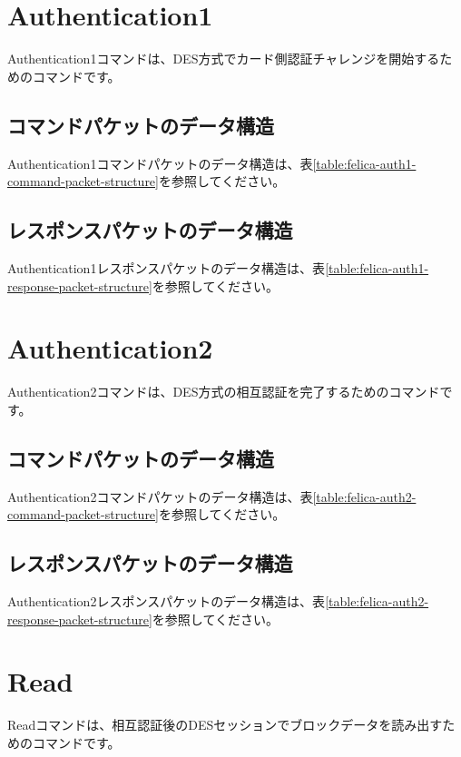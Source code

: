\documentclass[a4paper]{report}
\begin{document}
\section{Authentication1}

Authentication1コマンドは、DES方式でカード側認証チャレンジを開始するためのコマンドです。

\subsection{コマンドパケットのデータ構造}

Authentication1コマンドパケットのデータ構造は、表\ref{table:felica-auth1-command-packet-structure}を参照してください。

\subsection{レスポンスパケットのデータ構造}

Authentication1レスポンスパケットのデータ構造は、表\ref{table:felica-auth1-response-packet-structure}を参照してください。

\section{Authentication2}

Authentication2コマンドは、DES方式の相互認証を完了するためのコマンドです。

\subsection{コマンドパケットのデータ構造}

Authentication2コマンドパケットのデータ構造は、表\ref{table:felica-auth2-command-packet-structure}を参照してください。

\subsection{レスポンスパケットのデータ構造}

Authentication2レスポンスパケットのデータ構造は、表\ref{table:felica-auth2-response-packet-structure}を参照してください。

\section{Read}

Readコマンドは、相互認証後のDESセッションでブロックデータを読み出すためのコマンドです。
\end{document}
